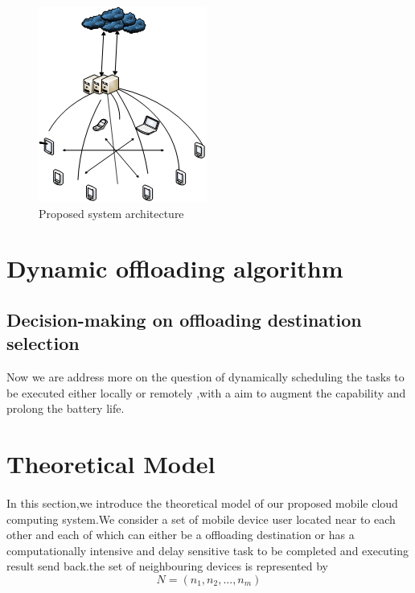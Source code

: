 \documentclass[review]{elsarticle}
\begin{document}
\begin{figure}[ht]
\centering
\includegraphics[scale=0.7]{architecture.png}
\caption{Proposed system architecture}
\label{fig:architecture}
\end{figure}
\section{Dynamic offloading algorithm}
    \subsection{Decision-making on offloading destination selection }
    Now we are address more on the question of dynamically scheduling the tasks to be executed either locally or remotely ,with a aim to augment the capability and prolong the battery life.
\section{Theoretical Model}        
        \paragraph{}
        In this section,we introduce the theoretical model of our proposed mobile cloud computing system.We consider a set of mobile device user located near to each other and each of which can either be a offloading destination or has a computationally intensive and delay sensitive task to be completed and executing result send back.the set of neighbouring devices is represented by  
          $$N=(n_{1},n_{2},...,n_{m})$$ 
\end{document}
